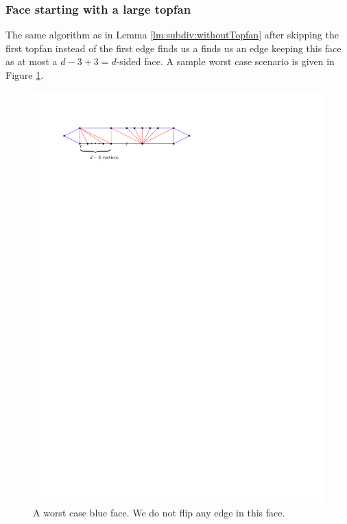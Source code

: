 \subsubsection{Face starting with a large topfan}
  The same algorithm as in Lemma \ref{lm:subdiv:withoutTopfan} after skipping the first topfan instead of the first edge finds us a finds us an edge keeping this face as at most a $ d - 3 +3 = d$-sided face. A sample worst case scenario is given in Figure \ref{fig:subdiv:worstCaseWithTopFan}.

  \begin{figure}[h]
    \centering
    \includegraphics[scale=1]{blueFaceSubdivision/img/worstCaseWithTopFan}
    \caption{A worst case blue face. We do not flip any edge in this face.}
    \label{fig:subdiv:worstCaseWithTopFan}
  \end{figure}


